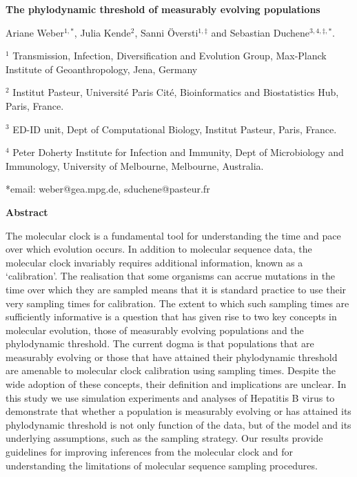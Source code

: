 \documentclass[11pt]{article}
\begin{document}
\begin{flushright}

\end{flushright}
\begin{center}
	\begin{LARGE}
	\textbf{The phylodynamic threshold of measurably evolving populations}
	\end{LARGE}

Ariane Weber$^{1,*}$, Julia Kende$^{2}$, Sanni Översti$^{1, \ddagger}$ and Sebastian Duchene$^{3,4,\ddagger, *}$.
\end{center}

$^{1}$ Transmission, Infection, Diversification and Evolution Group, Max-Planck Institute of Geoanthropology, Jena, Germany

$^{2}$ Institut Pasteur, Université Paris Cité, Bioinformatics and Biostatistics Hub, Paris, France.

$^{3}$ ED-ID unit, Dept of Computational Biology, Institut Pasteur, Paris, France.

$^{4}$ Peter Doherty Institute for Infection and Immunity, Dept of Microbiology and Immunology, University of Melbourne, Melbourne, Australia.


*email: weber@gea.mpg.de, sduchene@pasteur.fr
\newline

\begin{Large}
	\textbf{Abstract}
\end{Large}
The molecular clock is a fundamental tool for understanding the time and pace over which evolution occurs. In addition to molecular sequence data, the molecular clock invariably requires additional information, known as a `calibration'. The realisation that some organisms can accrue mutations in the time over which they are sampled means that it is standard practice to use their very sampling times for calibration. The extent to which such sampling times are sufficiently informative is a question that has given rise to two key concepts in molecular evolution, those of measurably evolving populations and the phylodynamic threshold. The current dogma is that populations that are measurably evolving or those that have attained their phylodynamic threshold are amenable to molecular clock calibration using sampling times. Despite the wide adoption of these concepts, their definition and implications are unclear. In this study we use simulation experiments and analyses of Hepatitis B virus to demonstrate that whether a population is measurably evolving or has attained its phylodynamic threshold is not only function of the data, but of the model and its underlying assumptions, such as the sampling strategy. Our results provide guidelines for improving inferences from the molecular clock and for understanding the limitations of molecular sequence sampling procedures. 
\end{document}
